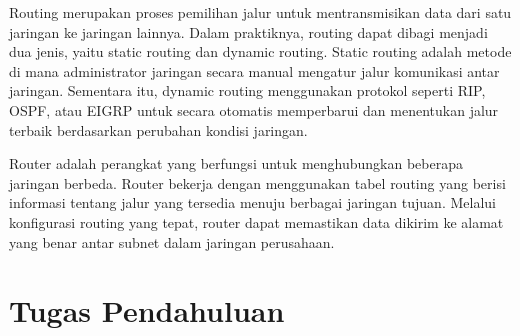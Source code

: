 Routing merupakan proses pemilihan jalur untuk mentransmisikan data dari satu jaringan ke jaringan lainnya. Dalam praktiknya, routing dapat dibagi menjadi dua jenis, yaitu static routing dan dynamic routing. Static routing adalah metode di mana administrator jaringan secara manual mengatur jalur komunikasi antar jaringan. Sementara itu, dynamic routing menggunakan protokol seperti RIP, OSPF, atau EIGRP untuk secara otomatis memperbarui dan menentukan jalur terbaik berdasarkan perubahan kondisi jaringan.

Router adalah perangkat yang berfungsi untuk menghubungkan beberapa jaringan berbeda. Router bekerja dengan menggunakan tabel routing yang berisi informasi tentang jalur yang tersedia menuju berbagai jaringan tujuan. Melalui konfigurasi routing yang tepat, router dapat memastikan data dikirim ke alamat yang benar antar subnet dalam jaringan perusahaan.

\section{Tugas Pendahuluan}


